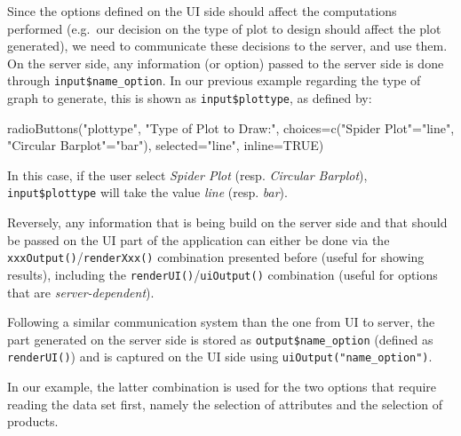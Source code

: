 \documentclass[
]{krantz}
\makeatletter
\newenvironment{Shaded}{\begin{snugshade}}{\end{snugshade}}
\newcommand{\AttributeTok}[1]{\textcolor[rgb]{0.61,0.61,0.61}{#1}}
\newcommand{\ConstantTok}[1]{\textcolor[rgb]{0,0,0}{#1}}
\newcommand{\FunctionTok}[1]{\textcolor[rgb]{0,0,0}{#1}}
\newcommand{\NormalTok}[1]{#1}
\newcommand{\OtherTok}[1]{\textcolor[rgb]{0.37,0.37,0.37}{#1}}
\newcommand{\StringTok}[1]{\textcolor[rgb]{0.5,0.5,0.5}{#1}}
\newenvironment{kframe}{%
\medskip{}
\setlength{\fboxsep}{.8em}
 \def\at@end@of@kframe{}%
 \ifinner\ifhmode%
  \def\at@end@of@kframe{\end{minipage}}%
  \begin{minipage}{\columnwidth}%
 \fi\fi%
 \def\FrameCommand##1{\hskip\@totalleftmargin \hskip-\fboxsep
 \colorbox{shadecolor}{##1}\hskip-\fboxsep
     \hskip-\linewidth \hskip-\@totalleftmargin \hskip\columnwidth}%
 \MakeFramed {\advance\hsize-\width
   \@totalleftmargin\z@ \linewidth\hsize
   \@setminipage}}%
 {\par\unskip\endMakeFramed%
 \at@end@of@kframe}
\renewenvironment{Shaded}{\begin{kframe}}{\end{kframe}}
\makeatother
\begin{document}
Since the options defined on the UI side should affect the computations performed (e.g.~our decision on the type of plot to design should affect the plot generated), we need to communicate these decisions to the server, and use them.
On the server side, any information (or option) passed to the server side is done through \texttt{input\$name\_option}. In our previous example regarding the type of graph to generate, this is shown as \texttt{input\$plottype}, as defined by:

\begin{Shaded}
\begin{Highlighting}[]
\FunctionTok{radioButtons}\NormalTok{(}\StringTok{"plottype"}\NormalTok{, }\StringTok{"Type of Plot to Draw:"}\NormalTok{, }
             \AttributeTok{choices=}\FunctionTok{c}\NormalTok{(}\StringTok{"Spider Plot"}\OtherTok{=}\StringTok{"line"}\NormalTok{, }\StringTok{"Circular Barplot"}\OtherTok{=}\StringTok{"bar"}\NormalTok{), }
             \AttributeTok{selected=}\StringTok{"line"}\NormalTok{, }\AttributeTok{inline=}\ConstantTok{TRUE}\NormalTok{)}
\end{Highlighting}
\end{Shaded}

In this case, if the user select \emph{Spider Plot} (resp. \emph{Circular Barplot}), \texttt{input\$plottype} will take the value \emph{line} (resp. \emph{bar}).

Reversely, any information that is being build on the server side and that should be passed on the UI part of the application can either be done via the \texttt{xxxOutput()}/\texttt{renderXxx()} combination presented before (useful for showing results), including the \texttt{renderUI()}/\texttt{uiOutput()} combination (useful for options that are \emph{server-dependent}).

Following a similar communication system than the one from UI to server, the part generated on the server side is stored as \texttt{output\$name\_option} (defined as \texttt{renderUI()}) and is captured on the UI side using \texttt{uiOutput("name\_option")}.

In our example, the latter combination is used for the two options that require reading the data set first, namely the selection of attributes and the selection of products.
\end{document}
